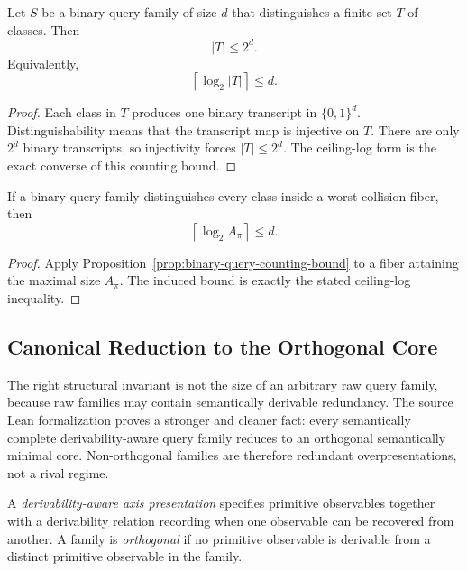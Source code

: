 \begin{proposition}\label{prop:binary-query-counting-bound}
Let $S$ be a binary query family of size $d$ that distinguishes a finite set $T$ of classes. Then
\[
|T| \le 2^d.
\]
Equivalently,
\[
\left\lceil \log_2 |T| \right\rceil \le d.
\]
\end{proposition}

\begin{proof}
Each class in $T$ produces one binary transcript in $\{0,1\}^d$. Distinguishability means that the transcript map is injective on $T$. There are only $2^d$ binary transcripts, so injectivity forces $|T| \le 2^d$. The ceiling-log form is the exact converse of this counting bound.
\end{proof}

\begin{corollary}\label{cor:worst-fiber-query-lower-bound}
If a binary query family distinguishes every class inside a worst collision fiber, then
\[
\left\lceil \log_2 A_{\pi} \right\rceil \le d.
\]
\end{corollary}

\begin{proof}
Apply Proposition~\ref{prop:binary-query-counting-bound} to a fiber attaining the maximal size $A_{\pi}$. The induced bound is exactly the stated ceiling-log inequality.
\end{proof}

\subsection{Canonical Reduction to the Orthogonal Core}

The right structural invariant is not the size of an arbitrary raw query family, because raw families may contain semantically derivable redundancy. The source Lean formalization proves a stronger and cleaner fact: every semantically complete derivability-aware query family reduces to an orthogonal semantically minimal core. Non-orthogonal families are therefore redundant overpresentations, not a rival regime.

\begin{definition}
A \emph{derivability-aware axis presentation} specifies primitive observables together with a derivability relation recording when one observable can be recovered from another. A family is \emph{orthogonal} if no primitive observable is derivable from a distinct primitive observable in the family.
\end{definition}

